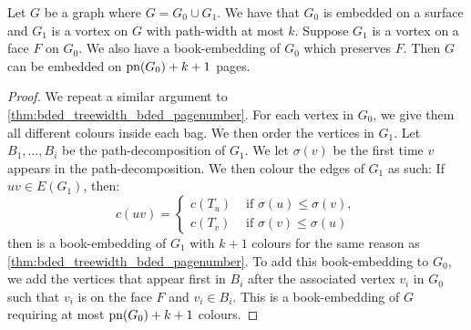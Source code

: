 \begin{lemma}\label{lem:preserved_faces_pagenumber}
	Let \(G\) be a graph where \(G = G_0 \cup G_1\). We have that \(G_0\) is embedded on a surface and \(G_1\) is a vortex on \(G\) with path-width at most \(k\). Suppose \(G_1\) is a vortex on a face \(F\) on \(G_0\). We also have a book-embedding of \(G_0\) which preserves \(F\). Then $G$ can be embedded on \(\operatorname{pn}(G_0) + k + 1\) pages.
\end{lemma}

\begin{proof}
	We repeat a similar argument to \cref{thm:bded_treewidth_bded_pagenumber}. For each vertex in \(G_0\), we give them all different colours inside each bag. We then order the vertices in \(G_1\). Let \(B_1, \ldots, B_i\) be the path-decomposition of \(G_1\). We let \(\sigma(v)\) be the first time \(v\) appears in the path-decomposition. We then colour the edges of \(G_1\) as such: If \(uv \in E(G_1)\), then:
	\begin{equation}
		c(uv) =
		\begin{cases}
			c(T_u) & \text{ if } \sigma(u) \leq \sigma(v), \\
			c(T_v) & \text{ if } \sigma(v) \leq \sigma(u)
		\end{cases}
	\end{equation}
	then is a book-embedding of \(G_1\) with \(k+1\) colours for the same reason as \cref{thm:bded_treewidth_bded_pagenumber}.
	To add this book-embedding to \(G_0\), we add the vertices that appear first in \(B_i\) after the associated vertex \(v_i\) in \(G_0\) such that \(v_i\) is on the face \(F\) and \(v_i \in B_i\). This is a book-embedding of \(G\) requiring at most \(\operatorname{pn}(G_0) + k + 1\) colours.
\end{proof}

